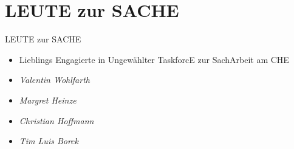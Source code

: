 \documentclass[compress, aspectratio=169]{beamer}
\begin{document}
\section{LEUTE zur SACHE}

\begin{frame}{LEUTE zur SACHE}
	\begin{itemize}
		\item Lieblings Engagierte in Ungewählter TaskforcE zur SachArbeit am CHE
		\item \emph{Valentin Wohlfarth}
		\item \emph{Margret Heinze}
		\item \emph{Christian Hoffmann}
		\item \emph{Tim Luis Borck}
	\end{itemize}
\end{frame}


\end{document}
